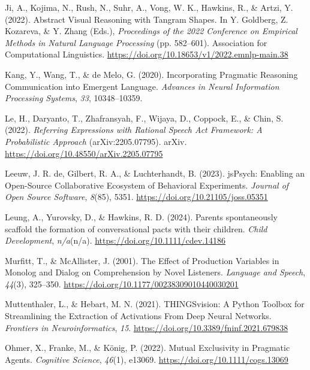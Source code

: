 \documentclass[10pt, letterpaper]{article}
\begin{document}
\begin{CSLReferences}{1}{0}
Ji, A., Kojima, N., Rush, N., Suhr, A., Vong, W. K., Hawkins, R., \&
Artzi, Y. (2022). Abstract {Visual Reasoning} with {Tangram Shapes}. In
Y. Goldberg, Z. Kozareva, \& Y. Zhang (Eds.), \emph{Proceedings of the
2022 {Conference} on {Empirical Methods} in {Natural Language
Processing}} (pp. 582--601). Association for Computational Linguistics.
\url{https://doi.org/10.18653/v1/2022.emnlp-main.38}

Kang, Y., Wang, T., \& de Melo, G. (2020). Incorporating {Pragmatic
Reasoning Communication} into {Emergent Language}. \emph{Advances in
{Neural Information Processing Systems}}, \emph{33}, 10348--10359.

Le, H., Daryanto, T., Zhafransyah, F., Wijaya, D., Coppock, E., \& Chin,
S. (2022). \emph{Referring {Expressions} with {Rational Speech Act
Framework}: {A Probabilistic Approach}} (arXiv:2205.07795). arXiv.
\url{https://doi.org/10.48550/arXiv.2205.07795}

Leeuw, J. R. de, Gilbert, R. A., \& Luchterhandt, B. (2023). {jsPsych}:
{Enabling} an {Open-Source Collaborative Ecosystem} of {Behavioral
Experiments}. \emph{Journal of Open Source Software}, \emph{8}(85),
5351. \url{https://doi.org/10.21105/joss.05351}

Leung, A., Yurovsky, D., \& Hawkins, R. D. (2024). Parents spontaneously
scaffold the formation of conversational pacts with their children.
\emph{Child Development}, \emph{n/a}(n/a).
\url{https://doi.org/10.1111/cdev.14186}

Murfitt, T., \& McAllister, J. (2001). The {Effect} of {Production
Variables} in {Monolog} and {Dialog} on {Comprehension} by {Novel
Listeners}. \emph{Language and Speech}, \emph{44}(3), 325--350.
\url{https://doi.org/10.1177/00238309010440030201}

Muttenthaler, L., \& Hebart, M. N. (2021). {THINGSvision}: {A Python
Toolbox} for {Streamlining} the {Extraction} of {Activations From Deep
Neural Networks}. \emph{Frontiers in Neuroinformatics}, \emph{15}.
\url{https://doi.org/10.3389/fninf.2021.679838}

Ohmer, X., Franke, M., \& König, P. (2022). Mutual {Exclusivity} in
{Pragmatic Agents}. \emph{Cognitive Science}, \emph{46}(1), e13069.
\url{https://doi.org/10.1111/cogs.13069}


\end{CSLReferences}
\end{document}
